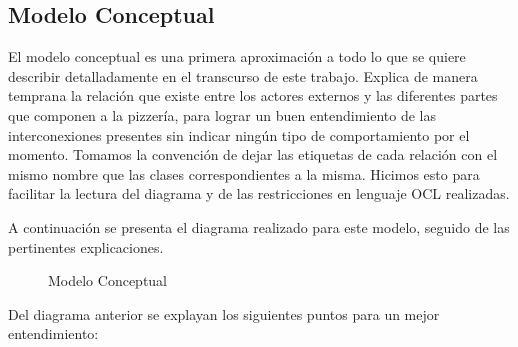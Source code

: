 \documentclass[a4paper,10pt]{article}
\begin{document}
\bigskip

\subsection*{Modelo Conceptual}

El modelo conceptual es una primera aproximaci\'on a todo lo que se quiere describir detalladamente en el transcurso de este trabajo. Explica 
de manera temprana la relaci\'on que existe entre los actores externos y las diferentes partes que componen a la pizzer\'ia, para lograr un buen
entendimiento de las interconexiones presentes sin indicar ning\'un tipo de comportamiento por el momento. Tomamos la convención de dejar
las etiquetas de cada relación con el mismo nombre que las clases correspondientes a la misma. Hicimos esto para facilitar la lectura del diagrama
y de las restricciones en lenguaje OCL realizadas.

A continuaci\'on se presenta el diagrama realizado para este modelo, seguido de las pertinentes explicaciones.

\begin{figure}[H]
\centering
{}
\caption{Modelo Conceptual}
\end{figure}

\medskip

Del diagrama anterior se explayan los siguientes puntos para un mejor entendimiento:
\end{document}
